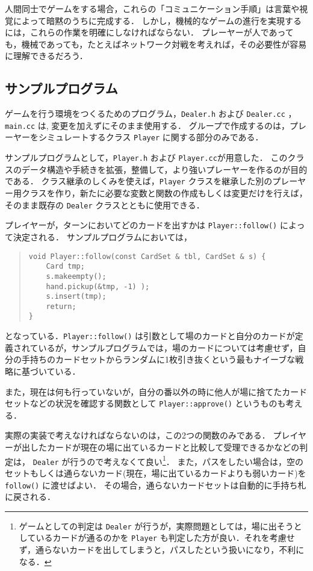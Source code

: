 人間同士でゲームをする場合，これらの「コミュニケーション手順」は言葉や視覚によって暗黙のうちに完成する．
しかし，機械的なゲームの進行を実現するには，これらの作業を明確にしなければならない．
プレーヤーが人であっても，機械であっても，たとえばネットワーク対戦を考えれば，その必要性が容易に理解できるだろう．


\subsection*{サンプルプログラム}
ゲームを行う環境をつくるためのプログラム，\verb+Dealer.h+ および \verb+Dealer.cc+ ，\verb+main.cc+ は, 変更を加えずにそのまま使用する．
グループで作成するのは，プレーヤーをシミュレートするクラス \verb+Player+ に関する部分のみである．

サンプルプログラムとして，\verb+Player.h+ および \verb+Player.cc+が用意した．
このクラスのデータ構造や手続きを拡張，整備して，より強いプレーヤーを作るのが目的である．
クラス継承のしくみを使えば，\verb+Player+ クラスを継承した別のプレーヤー用クラスを作り，新たに必要な変数と関数の作成もしくは変更だけを行えば，そのまま既存の \verb+Dealer+ クラスとともに使用できる．

プレイヤーが，ターンにおいてどのカードを出すかは \verb+Player::follow()+ によって決定される．
サンプルプログラムにおいては，
\begin{quote}
\begin{verbatim}
void Player::follow(const CardSet & tbl, CardSet & s) {
    Card tmp;
    s.makeempty();
    hand.pickup(&tmp, -1) );
    s.insert(tmp);
    return;
}
\end{verbatim}
\end{quote}
となっている．\verb+Player::follow()+ は引数として場のカードと自分のカードが定義されているが，サンプルプログラムでは，場のカードについては考慮せず，自分の手持ちのカードセットからランダムに1枚引き抜くという最もナイーブな戦略に基づいている．

また，現在は何も行っていないが，自分の番以外の時に他人が場に捨てたカードセットなどの状況を確認する関数として \verb+Player::approve()+ というものも考える．
 
実際の実装で考えなければならないのは，この2つの関数のみである．
プレイヤーが出したカードが現在の場に出ているカードと比較して受理できるかなどの判定は， \verb+Dealer+ が行うので考えなくて良い\footnote{ゲームとしての判定は \verb+Dealer+ が行うが，実際問題としては，場に出そうとしているカードが通るのかを \verb+Player+ も判定した方が良い．それを考慮せず，通らないカードを出してしまうと，パスしたという扱いになり，不利になる．}．
また，パスをしたい場合は，空のセットもしくは通らないカード(現在，場に出ているカードよりも弱いカード)を \verb+follow()+ に渡せばよい．
その場合，通らないカードセットは自動的に手持ち札に戻される．
 
